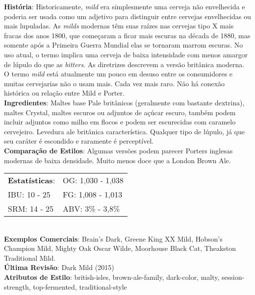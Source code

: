 \textbf{História}: Historicamente, \textit{mild} era simplesmente uma cerveja não envelhecida e poderia ser usada como um adjetivo para distinguir entre cervejas envelhecidas ou mais lupuladas. As \textit{milds} modernas têm suas raízes nas cervejas tipo X mais fracas dos anos 1800, que começaram a ficar mais escuras na década de 1880, mas somente após a Primeira Guerra Mundial elas se tornaram marrom escuras. No uso atual, o termo implica uma cerveja de baixa intensidade com menos amargor de lúpulo do que as \textit{bitters}. As diretrizes descrevem a versão britânica moderna. O termo \textit{mild} está atualmente um pouco em desuso entre os consumidores e muitas cervejarias não o usam mais. Cada vez mais raro. Não há conexão histórica ou relação entre Mild e Porter. \\
\textbf{Ingredientes}: Maltes base Pale britânicos (geralmente com bastante dextrina), maltes Crystal, maltes escuros ou adjuntos de açúcar escuro, também podem incluir adjuntos como milho em flocos e podem ser escurecidas com caramelo cervejeiro. Levedura ale britânica característica. Qualquer tipo de lúpulo, já que seu caráter é escondido e raramente é perceptível. \\
\textbf{Comparação de Estilos}: Algumas versões podem parecer Porters inglesas modernas de baixa densidade. Muito menos doce que a London Brown Ale. \\
\begin{tabular}{@{}p{35mm}p{35mm}@{}}
  \textbf{Estatísticas}: & OG: 1,030 - 1,038 \\
  IBU: 10 - 25  & FG: 1,008 - 1,013  \\
  SRM: 14 - 25  & ABV: 3\% - 3,8\%
\end{tabular}\\
\textbf{Exemplos Comerciais}: Brain's Dark, Greene King XX Mild, Hobson's Champion Mild, Mighty Oak Oscar Wilde, Moorhouse Black Cat, Theakston Traditional Mild. \\
\textbf{Última Revisão}: Dark Mild (2015) \\
\textbf{Atributos de Estilo}: british-isles, brown-ale-family, dark-color, malty, session-strength, top-fermented, traditional-style
